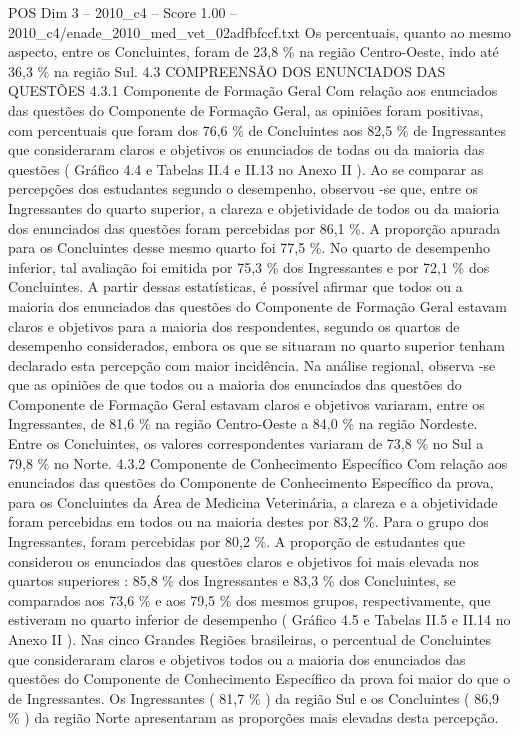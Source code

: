 \begin{textsample}{POS Dim 3 – 2010\_c4 – Score 1.00 – 2010\_c4/enade\_2010\_med\_vet\_02adfbfccf.txt}
Os percentuais, quanto ao mesmo aspecto, entre os Concluintes, foram de 23,8 \% na região Centro-Oeste, indo até 36,3 \% na região Sul. 4.3 COMPREENSÃO DOS ENUNCIADOS DAS QUESTÕES 4.3.1 Componente de Formação Geral Com relação aos enunciados das questões do Componente de Formação Geral, as opiniões foram positivas, com percentuais que foram dos 76,6 \% de Concluintes aos 82,5 \% de Ingressantes que consideraram claros e objetivos os enunciados de todas ou da maioria das questões ( Gráfico 4.4 e Tabelas II.4 e II.13 no Anexo II ).
Ao se comparar as percepções dos estudantes segundo o desempenho, observou -se que, entre os Ingressantes do quarto superior, a clareza e objetividade de todos ou da maioria dos enunciados das questões foram percebidas por 86,1 \%.
A proporção apurada para os Concluintes desse mesmo quarto foi 77,5 \%.
No quarto de desempenho inferior, tal avaliação foi emitida por 75,3 \% dos Ingressantes e por 72,1 \% dos Concluintes.
A partir dessas estatísticas, é possível afirmar que todos ou a maioria dos enunciados das questões do Componente de Formação Geral estavam claros e objetivos para a maioria dos respondentes, segundo os quartos de desempenho considerados, embora os que se situaram no quarto superior tenham declarado esta percepção com maior incidência.
Na análise regional, observa -se que as opiniões de que todos ou a maioria dos enunciados das questões do Componente de Formação Geral estavam claros e objetivos variaram, entre os Ingressantes, de 81,6 \% na região Centro-Oeste a 84,0 \% na região Nordeste.
Entre os Concluintes, os valores correspondentes variaram de 73,8 \% no Sul a 79,8 \% no Norte. 4.3.2 Componente de Conhecimento Específico Com relação aos enunciados das questões do Componente de Conhecimento Específico da prova, para os Concluintes da Área de Medicina Veterinária, a clareza e a objetividade foram percebidas em todos ou na maioria destes por 83,2 \%.
Para o grupo dos Ingressantes, foram percebidas por 80,2 \%.
A proporção de estudantes que considerou os enunciados das questões claros e objetivos foi mais elevada nos quartos superiores : 85,8 \% dos Ingressantes e 83,3 \% dos Concluintes, se comparados aos 73,6 \% e aos 79,5 \% dos mesmos grupos, respectivamente, que estiveram no quarto inferior de desempenho ( Gráfico 4.5 e Tabelas II.5 e II.14 no Anexo II ).
Nas cinco Grandes Regiões brasileiras, o percentual de Concluintes que consideraram claros e objetivos todos ou a maioria dos enunciados das questões do Componente de Conhecimento Específico da prova foi maior do que o de Ingressantes.
Os Ingressantes ( 81,7 \% ) da região Sul e os Concluintes ( 86,9 \% ) da região Norte apresentaram as proporções mais elevadas desta percepção.

\end{textsample}
